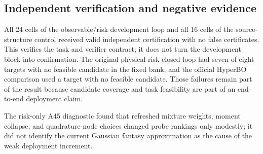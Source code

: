 \begin{table}[t]
\centering
\caption{Same-contract target-only baseline and paired mean differences.}
\label{tab:mp_target_only_main}

\end{table}

\subsection{Independent verification and negative evidence}

All 24 cells of the observable/risk development loop and all 16 cells of the
source-structure control received valid independent certification with no
false certificates.  This verifies the task and verifier contract; it does
not turn the development block into confirmation.  The original physical-risk
closed loop had seven of eight targets with no feasible candidate in the fixed
bank, and the official HyperBO comparison used a target with no feasible
candidate.  Those failures remain part of the result because candidate
coverage and task feasibility are part of an end-to-end deployment claim.

The risk-only A45 diagnostic found that refreshed mixture weights, moment
collapse, and quadrature-node choices changed probe rankings only modestly; it
did not identify the current Gaussian fantasy approximation as the cause of
the weak deployment increment.
